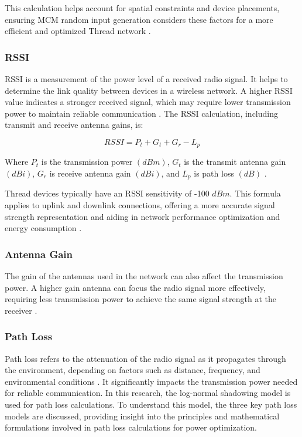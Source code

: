 This calculation helps account for spatial constraints and device placements, ensuring \gls{MCM} random input generation considers these factors for a more efficient and optimized Thread network \cite{dokmanic2015euclidean}.

\subsubsection{\acrlong{RSSI}}

\acrfull{RSSI} is a measurement of the power level of a received radio signal. It helps to determine the link quality between devices in a wireless network. A higher \gls{RSSI} value indicates a stronger received signal, which may require lower transmission power to maintain reliable communication \cite{benkic2008rssi}. The \gls{RSSI} calculation, including transmit and receive antenna gains, is:

\begin{equation}\label{eq:rssi}
    RSSI=P_t+G_t+G_r-L_p
\end{equation}

Where $P_t$ is the transmission power $\left(dBm\right)$, $G_t$ is the transmit antenna gain $\left(dBi\right)$, $G_r$ is receive antenna gain $\left(dBi\right)$, and $L_p$ is path loss $\left(dB\right)$ \cite{doi:10.1155/2014/371350}.

Thread devices typically have an \gls{RSSI} sensitivity of -100 $dBm$. This formula applies to uplink and downlink connections, offering a more accurate signal strength representation and aiding in network performance optimization and energy consumption \cite{semiconductor_nrf52840_2018_1}.

\subsubsection{Antenna Gain}

The gain of the antennas used in the network can also affect the transmission power. A higher gain antenna can focus the radio signal more effectively, requiring less transmission power to achieve the same signal strength at the receiver \cite{wu2014study}.

\subsubsection{Path Loss}

Path loss refers to the attenuation of the radio signal as it propagates through the environment, depending on factors such as distance, frequency, and environmental conditions \cite{cho2010mimo}. It significantly impacts the transmission power needed for reliable communication. In this research, the log-normal shadowing model is used for path loss calculations. To understand this model, the three key path loss models are discussed, providing insight into the principles and mathematical formulations involved in path loss calculations for power optimization.

